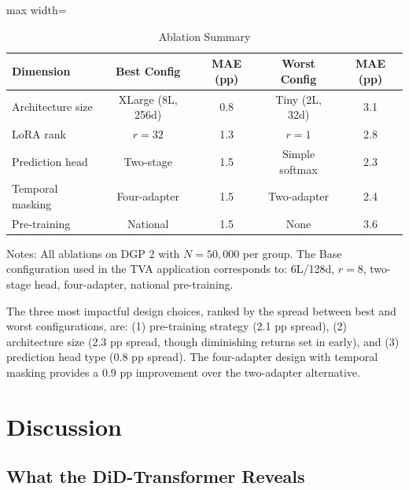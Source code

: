 \documentclass[12pt]{article}
\begin{document}
\begin{table}[H]
\centering
\caption{Ablation Summary}
\label{tab:ablation_summary}
\begin{threeparttable}
\begin{adjustbox}{max width=\textwidth}
\begin{tabular}{lcccc}
\toprule
Dimension & Best Config & MAE (pp) & Worst Config & MAE (pp) \\
\midrule
Architecture size & XLarge (8L, 256d) & 0.8 & Tiny (2L, 32d) & 3.1 \\
LoRA rank & $r = 32$ & 1.3 & $r = 1$ & 2.8 \\
Prediction head & Two-stage & 1.5 & Simple softmax & 2.3 \\
Temporal masking & Four-adapter & 1.5 & Two-adapter & 2.4 \\
Pre-training & National & 1.5 & None & 3.6 \\
\bottomrule
\end{tabular}
\end{adjustbox}
\begin{tablenotes}[flushleft]
\small
\item Notes: All ablations on DGP 2 with $N = 50,000$ per group. The Base configuration used in the TVA application corresponds to: 6L/128d, $r = 8$, two-stage head, four-adapter, national pre-training.
\end{tablenotes}
\end{threeparttable}
\end{table}

The three most impactful design choices, ranked by the spread between best and worst configurations, are: (1) pre-training strategy (2.1 pp spread), (2) architecture size (2.3 pp spread, though diminishing returns set in early), and (3) prediction head type (0.8 pp spread). The four-adapter design with temporal masking provides a 0.9 pp improvement over the two-adapter alternative.


\section{Discussion}\label{sec:discussion}

\subsection{What the DiD-Transformer Reveals}
\end{document}
